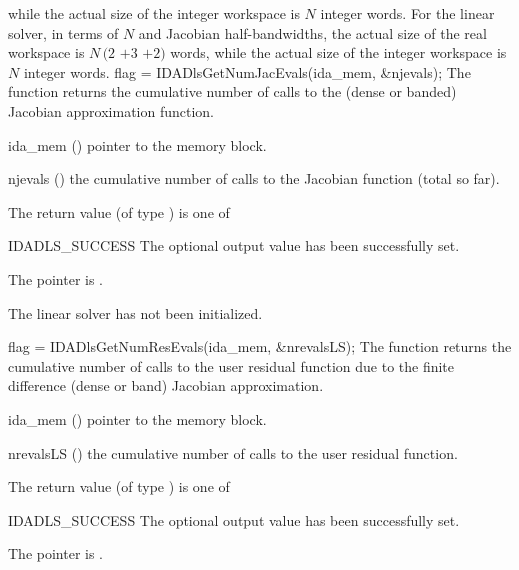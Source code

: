 {{  while the actual size of the integer workspace is $N$ integer words.
  For the {\idaband} linear solver, in terms of $N$ 
  and Jacobian half-bandwidths, the actual size of the real workspace is
  $N\,(2$ $+ 3$  $+ 2)$  words,
  while the actual size of the integer workspace is $N$ integer words.
}
{
  flag = IDADlsGetNumJacEvals(ida\_mem, \&njevals);
}
{
  The function  returns the
  cumulative number of calls to the {\idadls} (dense or banded) 
  Jacobian approximation function.
}
{
  \begin{args}[njevals]
  \item[ida\_mem] ()
    pointer to the {\ida} memory block.
  \item[njevals] ()
    the cumulative number of calls to the Jacobian function (total so far).
  \end{args}
}
{
  The return value  (of type ) is one of
  \begin{args}
  \item[IDADLS\_SUCCESS] 
    The optional output value has been successfully set.
  \item[\Id{IDADLS\_MEM\_NULL}]
    The  pointer is .
  \item[\Id{IDADLS\_LMEM\_NULL}]
    The {\idadense} linear solver has not been initialized.
  \end{args}
}
{}
{
  flag = IDADlsGetNumResEvals(ida\_mem, \&nrevalsLS);
}
{
  The function  returns the
  cumulative number of calls to the user residual function due to the 
  finite difference (dense or band) Jacobian approximation.
}
{
  \begin{args}[nrevalsLS]
  \item[ida\_mem] ()
    pointer to the {\ida} memory block.
  \item[nrevalsLS] ()
    the cumulative number of calls to the user residual function.
  \end{args}
}
{
  The return value  (of type ) is one of
  \begin{args}
  \item[IDADLS\_SUCCESS] 
    The optional output value has been successfully set.
  \item[\Id{IDADLS\_MEM\_NULL}]
    The  pointer is .
  \item[\Id{IDADLS\_LMEM\_NULL}]

\end{args}}}
